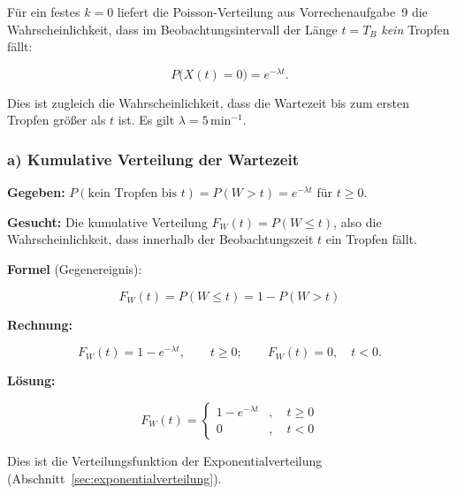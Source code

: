 Für ein festes $k = 0$ liefert die Poisson-Verteilung aus Vorrechenaufgabe~9 die
Wahrscheinlichkeit, dass im Beobachtungsintervall der Länge $t = T_B$
\emph{kein} Tropfen fällt:

$$
P\bigl(X(t) = 0\bigr) = e^{-\lambda t}.
$$

Dies ist zugleich die Wahrscheinlichkeit, dass die Wartezeit bis zum ersten
Tropfen größer als $t$ ist. Es gilt $\lambda = 5\,\mathrm{min}^{-1}$.

\subsubsection*{a) Kumulative Verteilung der Wartezeit}

\begin{beispiel}

\textbf{Gegeben:} $P(\text{kein Tropfen bis } t) = P(W > t) = e^{-\lambda t}$ für
$t \geq 0$.

\textbf{Gesucht:} Die kumulative Verteilung $F_W(t) = P(W \leq t)$, also die
Wahrscheinlichkeit, dass innerhalb der Beobachtungszeit $t$ ein Tropfen fällt.

\textbf{Formel} (Gegenereignis):

$$
F_W(t) = P(W \leq t) = 1 - P(W > t)
$$

\textbf{Rechnung:}

$$
F_W(t) = 1 - e^{-\lambda t}, \qquad t \geq 0; \qquad F_W(t) = 0, \quad t < 0.
$$

\textbf{Lösung:}

$$
\boxed{\;F_W(t) = \begin{cases} 1 - e^{-\lambda t} & , \quad t \geq 0 \\[2pt]
0 & , \quad t < 0 \end{cases}\;}
$$

Dies ist die Verteilungsfunktion der Exponentialverteilung
(Abschnitt~\ref{sec:exponentialverteilung}).

\begin{center}
\end{center}

\end{beispiel}

